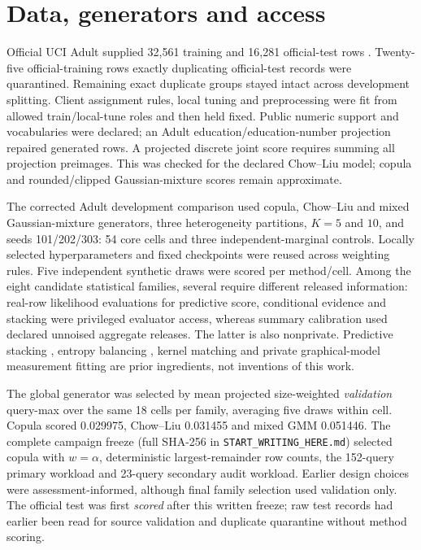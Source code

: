 \documentclass[11pt,a4paper]{article}
\begin{document}
\section{Data, generators and access}
Official UCI Adult supplied 32,561 training and 16,281 official-test rows \cite{uci_adult}. Twenty-five official-training rows exactly duplicating official-test records were quarantined. Remaining exact duplicate groups stayed intact across development splitting. Client assignment rules, local tuning and preprocessing were fit from allowed train/local-tune roles and then held fixed. Public numeric support and vocabularies were declared; an Adult education/education-number projection repaired generated rows. A projected discrete joint score requires summing all projection preimages. This was checked for the declared Chow--Liu model; copula and rounded/clipped Gaussian-mixture scores remain approximate.

The corrected Adult development comparison used copula, Chow--Liu and mixed Gaussian-mixture generators, three heterogeneity partitions, $K=5$ and $10$, and seeds 101/202/303: 54 core cells and three independent-marginal controls. Locally selected hyperparameters and fixed checkpoints were reused across weighting rules. Five independent synthetic draws were scored per method/cell. Among the eight candidate statistical families, several require different released information: real-row likelihood evaluations for predictive score, conditional evidence and stacking were privileged evaluator access, whereas summary calibration used declared unnoised aggregate releases. The latter is also nonprivate. Predictive stacking \cite{yao2018stacking}, entropy balancing \cite{hainmueller2012entropy}, kernel matching \cite{huang2009kmm} and private graphical-model measurement fitting \cite{mckenna2019pgm} are prior ingredients, not inventions of this work.

The global generator was selected by mean projected size-weighted \emph{validation} query-max over the same 18 cells per family, averaging five draws within cell. Copula scored 0.029975, Chow--Liu 0.031455 and mixed GMM 0.051446. The complete campaign freeze (full SHA-256 in \texttt{START\_WRITING\_HERE.md}) selected copula with $w=\alpha$, deterministic largest-remainder row counts, the 152-query primary workload and 23-query secondary audit workload. Earlier design choices were assessment-informed, although final family selection used validation only. The official test was first \emph{scored} after this written freeze; raw test records had earlier been read for source validation and duplicate quarantine without method scoring.
\end{document}
